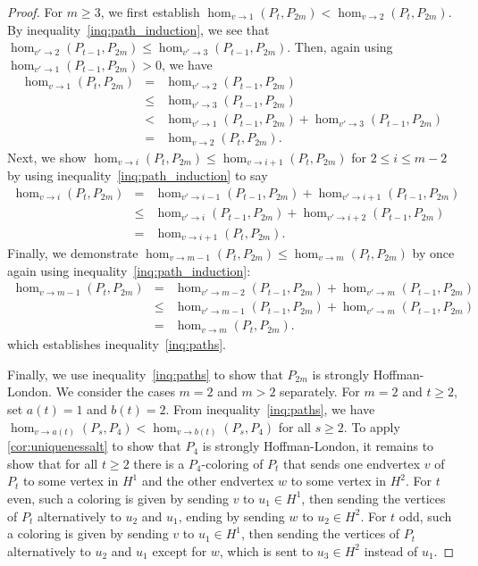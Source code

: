 \documentclass[10pt,a4paper]{amsart}
\newcommand{\homclass}[4]{\hom_{#1\to#2}(#3,#4)}
\begin{document}
\begin{proof}
For $m \ge 3$, we first establish $\homclass{v}{1}{P_t}{P_{2m}} < \homclass{v}{2}{P_t}{P_{2m}}$. By inequality~\eqref{inq:path_induction}, we see that $\homclass{v'}{2}{P_{t-1}}{P_{2m}} \le \homclass{v'}{3}{P_{t-1}}{P_{2m}}$. Then, again using $\homclass{v'}{1}{P_{t-1}}{P_{2m}} > 0$, we have
\begin{eqnarray*}
\homclass{v}{1}{P_t}{P_{2m}} &=& \homclass{v'}{2}{P_{t-1}}{P_{2m}} \\
	&\le& \homclass{v'}{3}{P_{t-1}}{P_{2m}} \\
	&<& \homclass{v'}{1}{P_{t-1}}{P_{2m}} + \homclass{v'}{3}{P_{t-1}}{P_{2m}} \\
	&=& \homclass{v}{2}{P_t}{P_{2m}}.
\end{eqnarray*}
Next, we show $\homclass{v}{i}{P_t}{P_{2m}} \le \homclass{v}{i+1}{P_t}{P_{2m}}$ for $2 \le i \le m-2$ by using inequality~\eqref{inq:path_induction} to say
\begin{eqnarray*}
\homclass{v}{i}{P_t}{P_{2m}} &=& \homclass{v'}{i-1}{P_{t-1}}{P_{2m}} + \homclass{v'}{i+1}{P_{t-1}}{P_{2m}} \\
	&\le& \homclass{v'}{i}{P_{t-1}}{P_{2m}} + \homclass{v'}{i+2}{P_{t-1}}{P_{2m}} \\
	&=& \homclass{v}{i+1}{P_t}{P_{2m}}.
\end{eqnarray*}
Finally, we demonstrate $\homclass{v}{m-1}{P_t}{P_{2m}} \le \homclass{v}{m}{P_t}{P_{2m}}$ by once again using inequality~\eqref{inq:path_induction}:
\begin{eqnarray*}
\homclass{v}{m-1}{P_t}{P_{2m}} &=& \homclass{v'}{m-2}{P_{t-1}}{P_{2m}} + \homclass{v'}{m}{P_{t-1}}{P_{2m}} \\
	&\le& \homclass{v'}{m-1}{P_{t-1}}{P_{2m}} + \homclass{v'}{m}{P_{t-1}}{P_{2m}} \\
	&=& \homclass{v}{m}{P_t}{P_{2m}}.
\end{eqnarray*}
which establishes inequality~\eqref{inq:paths}.

Finally, we use inequality~\eqref{inq:paths} to show that $P_{2m}$ is strongly Hoffman-London. We consider the cases $m=2$ and $m > 2$ separately. For $m=2$ and $t \ge 2$, set $a(t)=1$ and $b(t)=2$. From inequality~\eqref{inq:paths}, we have $\homclass{v}{a(t)}{P_s}{P_{4}} < \homclass{v}{b(t)}{P_s}{P_{4}}$ for all $s \ge 2$. To apply \cref{cor:uniquenessalt} to show that $P_{4}$ is strongly Hoffman-London, it remains to show that for all $t \ge 2$ there is a $P_{4}$-coloring of $P_t$ that sends one endvertex $v$ of $P_t$ to some vertex in $H^1$ and the other endvertex $w$ to some vertex in $H^2$. For $t$ even, such a coloring is given by sending $v$ to $u_1\in H^1$, then sending the vertices of $P_t$ alternatively to $u_2$ and $u_1$, ending by sending $w$ to $u_2 \in H^2$. For $t$ odd, such a coloring is given by sending $v$ to $u_1\in H^1$, then sending the vertices of $P_t$ alternatively to $u_2$ and $u_1$ except for $w$, which is sent to $u_3 \in H^2$ instead of $u_1$.


\end{proof}
\end{document}
